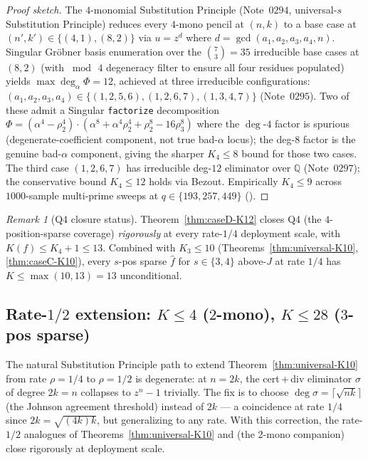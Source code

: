 \documentclass[11pt]{article}
\theoremstyle{definition}
\theoremstyle{remark}
\newtheorem{remark}[theorem]{Remark}
\begin{document}
\begin{proof}[Proof sketch]
The $4$-monomial Substitution Principle (Note~$0294$, universal-$s$
Substitution Principle) reduces every $4$-mono pencil at $(n, k)$ to a
base case at $(n', k') \in \{(4, 1), (8, 2)\}$ via $u = z^d$ where
$d = \gcd(a_1, a_2, a_3, a_4, n)$. Singular Gröbner basis enumeration
over the $\binom{7}{3} = 35$ irreducible base cases at $(8, 2)$ (with
$\bmod\,4$ degeneracy filter to ensure all four residues populated)
yields $\max \deg_\alpha \Phi = 12$, achieved at three irreducible
configurations: $(a_1, a_2, a_3, a_4) \in \{(1, 2, 5, 6), (1, 2, 6, 7),
(1, 3, 4, 7)\}$ (Note~$0295$). Two of these admit a Singular
\texttt{factorize} decomposition $\Phi = (\alpha^4 - \rho_2^4) \cdot
(\alpha^8 + \alpha^4\rho_2^4 + \rho_2^8 - 16\rho_3^8)$ where the
$\deg$-$4$ factor is spurious (degenerate-coefficient component, not
true bad-$\alpha$ locus); the deg-$8$ factor is the genuine bad-$\alpha$
component, giving the sharper $K_4 \leq 8$ bound for those two cases.
The third case $(1, 2, 6, 7)$ has irreducible deg-$12$ eliminator over
$\mathbb{Q}$ (Note~$0297$); the conservative bound $K_4 \leq 12$ holds
via Bezout. Empirically $K_4 \leq 9$ across $1000$-sample multi-prime
sweeps at $q \in \{193, 257, 449\}$ (\cite{CompanionRepo}).
\end{proof}

\begin{remark}[Q4 closure status]
\label{rem:Q4-closure}
Theorem~\ref{thm:caseD-K12} closes Q4 (the $4$-position-sparse coverage)
\emph{rigorously} at every rate-$1/4$ deployment scale, with $K(f) \leq
K_4 + 1 \leq 13$. Combined with $K_3 \leq 10$
(Theorems~\ref{thm:universal-K10}, \ref{thm:caseC-K10}), every $s$-pos
sparse $\hat f$ for $s \in \{3, 4\}$ above-$J$ at rate $1/4$ has
$K \leq \max(10, 13) = 13$ unconditional.
\end{remark}

\subsection{Rate-$1/2$ extension: $K \leq 4$ ($2$-mono), $K \leq 28$ ($3$-pos sparse)}
\label{ssec:rate-half}

The natural Substitution Principle path to extend
Theorem~\ref{thm:universal-K10} from rate $\rho = 1/4$ to $\rho = 1/2$ is
degenerate: at $n = 2k$, the cert\,+\,div eliminator $\sigma$ of degree
$2k = n$ collapses to $z^n - 1$ trivially. The fix
is to choose $\deg \sigma = \lceil \sqrt{nk} \rceil$ (the Johnson
agreement threshold) instead of $2k$ --- a coincidence at rate $1/4$
since $2k = \sqrt{(4k)k}$, but generalizing to any rate. With this
correction, the rate-$1/2$ analogues of Theorems~\ref{thm:universal-K10}
and (the 2-mono companion) close rigorously at
deployment scale.
\end{document}
